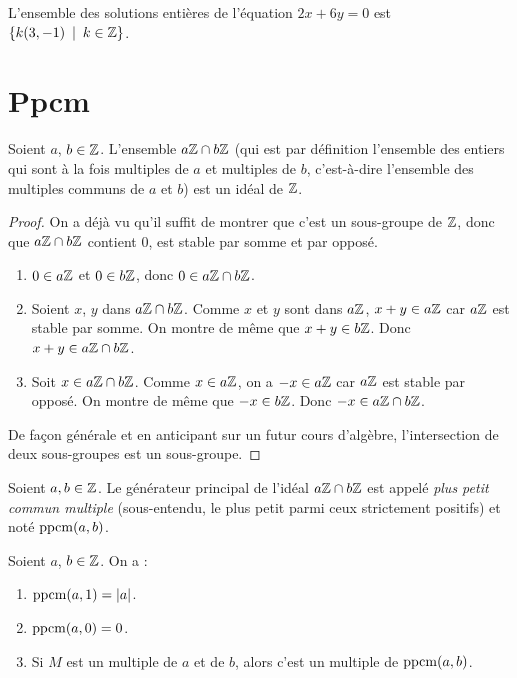 \begin{exemple}
L'ensemble des solutions entières de l'équation $2x+6y=0$ est $\{k(3,-1)\:\mid\:k\in\mathbb{Z}\}$.
\end{exemple}



\section{Ppcm}

\begin{proposition}
Soient $a$, $b \in \mathbb{Z}$. L'ensemble $a\mathbb{Z}\cap b\mathbb{Z}$ (qui est par définition l'ensemble des entiers qui sont à la fois multiples de $a$ et multiples de $b$, c'est-à-dire l'ensemble des multiples communs de $a$ et $b$) est un idéal de $\mathbb{Z}$.
\end{proposition}
\begin{proof}
On a déjà vu qu'il suffit de montrer que c'est un sous-groupe de $\mathbb{Z}$, donc que $a\mathbb{Z}\cap b\mathbb{Z}$ contient $0$, est stable par somme et par opposé. 
\begin{enumerate}
\item $0 \in a\mathbb{Z}$ et $0\in b\mathbb{Z}$, donc $0 \in a\mathbb{Z}\cap b\mathbb{Z}$.
\item Soient $x$, $y$ dans $a\mathbb{Z}\cap b\mathbb{Z}$. Comme $x$ et $y$ sont dans $a\mathbb{Z}$, $x+y\in a\mathbb{Z}$ car $a\mathbb{Z}$ est stable par somme. On montre de même que $x+y\in b\mathbb{Z}$. Donc $x+y \in a\mathbb{Z}\cap b\mathbb{Z}$.
\item Soit $x\in a\mathbb{Z}\cap b\mathbb{Z}$. Comme $x\in a\mathbb{Z}$, on a $-x\in a\mathbb{Z}$ car $a\mathbb{Z}$ est stable par opposé. On montre de même que $-x\in b\mathbb{Z}$. Donc $-x \in a\mathbb{Z}\cap b\mathbb{Z}$.
\end{enumerate}

De façon générale et en anticipant sur un futur cours d'algèbre, l'intersection de deux sous-groupes est un sous-groupe.
\end{proof}

\begin{definition}
Soient $a, b\in \mathbb{Z}$. Le générateur principal de l'idéal $a\mathbb{Z}\cap b\mathbb{Z}$ est appelé \emph{plus petit commun multiple} (sous-entendu, le plus petit parmi ceux strictement positifs) et noté $\operatorname{ppcm}(a,b)$.
\end{definition}

\begin{proposition}
Soient $a$, $b \in \mathbb{Z}$. On a :
\begin{enumerate}
\item $\operatorname{ppcm}(a,1)=|a|$.
\item $\operatorname{ppcm}(a,0)=0$.
\item Si $M$ est un multiple de $a$ et de $b$, alors c'est un multiple de $\operatorname{ppcm}(a,b)$.
\end{enumerate}
\end{proposition}

